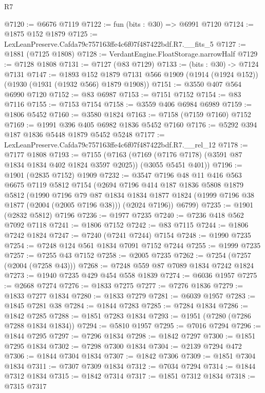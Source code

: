 \begin{lexlean}{R7}
\begin{coremodule}
@7120 := @6676 @7119
@7122 := fun (bits : @30) => @6991 @7120
@7124 := @1875 @152 @1879
@7125 := LexLeanPreserve.Cafda79c757163ffe4c6f07f487422bdf.R7.__fits_5
@7127 := @1881 (@7125 @1808)
@7128 := VerdantEngine.FloatStorage.narrowHalf
@7129 := @7128 @1808
@7131 := @7127 (@83 @7129)
@7133 := (bits : @30) -> @7124 @7131
@7147 := @1893
    @152
    @1879
    @7131
    @566
    @1909
    (@1914 (@1924 @152))
    (@1930 (@1931 (@1932 @566) @1879 @1908))
@7151 := @3550 @407 @564 @6990 @7120
@7152 := @83 @6987
@7153 := @7151 @7152
@7154 := @83 @7116
@7155 := @7153 @7154
@7158 := @3559 @406 @6984 @6989
@7159 := @1806 @5452
@7160 := @3580 @1824
@7163 := @7158 (@7159 @7160) @7152
@7169 := @1991 @396 @405 @6982 @1836 @5452 @7160
@7176 := @5292 @394 @187 @1836 @5448 @1879 @5452 @5248
@7177 := LexLeanPreserve.Cafda79c757163ffe4c6f07f487422bdf.R7.__rel_12
@7178 := @7177 @1808
@7193 := @7155
    (@7163 (@7169 (@7176 @7178) (@3591 @87 @1834 @1834 @402 @1824 @3597 @2025)) (@3055 @5451 @401))
@7196 := @1901 (@2835 @7152) @1909
@7232 := @3547
    @7196
    @48
    @11
    @416
    @563
    @6675
    @7119
    @5812
    @7154
    (@2694
      @7196
      @414
      @187
      @1836
      @5808
      @1879
      @5812
      (@1990
        @7196
        @79
        @87
        @1834
        @1834
        @1877
        @1824
        (@1999 @7196 @38 @1877 (@2004 (@2005 @7196 @38)))
        (@2024 @7196))
      @6799)
@7235 := @1901 (@2832 @5812) @7196
@7236 := @1977 @7235
@7240 := @7236 @418 @562 @7092 @7118
@7241 := @1806 @7152
@7242 := @83 @7115
@7244 := @1806 @7242 @1824
@7247 := @7240 (@7241 @7244) @7154
@7248 := @1990 @7235
@7254 := @7248 @124 @561 @1834 @7091 @7152 @7244
@7255 := @1999 @7235
@7257 := @7255 @43 @7152
@7258 := @2005 @7235
@7262 := @7254 (@7257 (@2004 (@7258 @43)))
@7268 := @7248 @559 @87 @7089 @1834 @7242 @1824
@7273 := @1940 @7235 @429 @454 @558 @1839
@7274 := @6036 @1957
@7275 := @2668 @7274
@7276 := @1833 @7275
@7277 := @7276 @1836
@7279 := @1833 @7277 @1834
@7280 := @1833 @7279
@7281 := @6039 @1957
@7283 := @1845 @7281 @38
@7284 := @1844 @7283
@7285 := @7284 @1834
@7286 := @1842 @7285
@7288 := @1851 @7283 @1834
@7293 := @1951 (@7280 (@7286 @7288 @1834 @1834))
@7294 := @5810 @1957
@7295 := @7016 @7294
@7296 := @1844 @7295
@7297 := @7296 @1834
@7298 := @1842 @7297
@7300 := @1851 @7295 @1834
@7302 := @7298 @7300 @1834
@7304 := @2139 @7294 @472
@7306 := @1844 @7304 @1834
@7307 := @1842 @7306
@7309 := @1851 @7304 @1834
@7311 := @7307 @7309 @1834
@7312 := @7034 @7294
@7314 := @1844 @7312 @1834
@7315 := @1842 @7314
@7317 := @1851 @7312 @1834
@7318 := @7315 @7317

\end{coremodule}
\end{lexlean}
